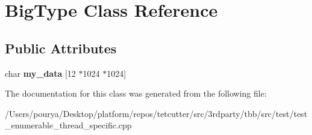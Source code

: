 \hypertarget{classBigType}{}\section{Big\+Type Class Reference}
\label{classBigType}
\subsection*{Public Attributes}
\begin{DoxyCompactItemize}
\item 
\hypertarget{classBigType_ade871842cac1ec03688954f21deebc70}{}char {\bfseries my\+\_\+data} \mbox{[}12 $\ast$1024 $\ast$1024\mbox{]}\label{classBigType_ade871842cac1ec03688954f21deebc70}

\end{DoxyCompactItemize}


The documentation for this class was generated from the following file\+:\begin{DoxyCompactItemize}
\item 
/\+Users/pourya/\+Desktop/platform/repos/tetcutter/src/3rdparty/tbb/src/test/test\+\_\+enumerable\+\_\+thread\+\_\+specific.\+cpp\end{DoxyCompactItemize}
